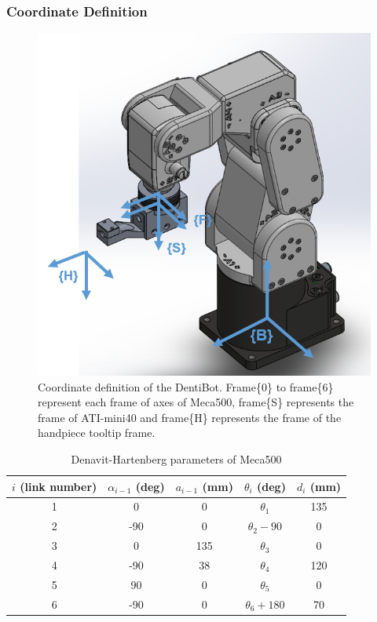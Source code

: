 \subsubsection{Coordinate Definition}
\begin{figure}[htbp]
\begin{center}
\includegraphics[width=0.6\linewidth]{Images/Coordinates.png}
\caption{
Coordinate definition of the DentiBot. Frame\{0\} to frame\{6\} represent each frame of axes of Meca500, frame\{S\} represents the frame of ATI-mini40 and frame\{H\} represents the frame of the handpiece tooltip frame.
}\label{fig:frames}
\end{center}
\end{figure} 

\begin{table}[htbp]
\centering
\caption{Denavit-Hartenberg parameters of Meca500}
\label{tab:DHtable}
\begin{tabular}{ccccc} 
\hline \hline
$i$ (link number)		&$\alpha _{i-1}$ (deg)	&$a_{i-1}$ (mm)	& $\theta _i$ (deg)			&$d_i$ (mm)	\\
\hline
1   					&0    					&0				&$\theta _1$				&135 \\
2   					&-90   					&0				&$\theta _2-90$				&0 \\
3  						&0    					&135			&$\theta _3$ 				&0 \\
4   					&-90    				&38				&$\theta _4$ 				&120 \\
5   					&90   					&0				&$\theta _5$ 				&0 \\
6						&-90  					&0				&$\theta _6+180$ 				&70 \\
\hline\hline
\end{tabular}
\end{table}


